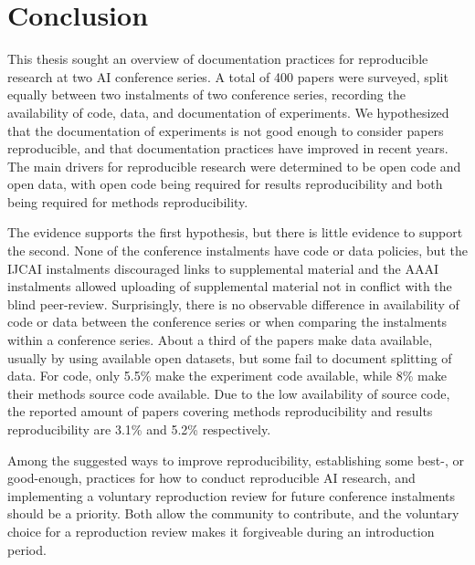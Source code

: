 \section{Conclusion}
This thesis sought an overview of documentation practices for reproducible research at two AI conference series. A total of 400 papers were surveyed, split equally between two instalments of two conference series, recording the availability of code, data, and documentation of experiments. We hypothesized that the documentation of experiments is not good enough to consider papers reproducible, and that documentation practices have improved in recent years. The main drivers for reproducible research were determined to be open code and open data, with open code being required for results reproducibility and both being required for methods reproducibility.

The evidence supports the first hypothesis, but there is little evidence to support the second. None of the conference instalments have code or data policies, but the IJCAI instalments discouraged links to supplemental material and the AAAI instalments allowed uploading of supplemental material not in conflict with the blind peer-review. Surprisingly, there is no observable difference in availability of code or data between the conference series or when comparing the instalments within a conference series. About a third of the papers make data available, usually by using available open datasets, but some fail to document splitting of data. For code, only 5.5\% make the experiment code available, while 8\% make their methods source code available. Due to the low availability of source code, the reported amount of papers covering methods reproducibility and results reproducibility are 3.1\% and 5.2\% respectively.

Among the suggested ways to improve reproducibility, establishing some best-, or good-enough, practices for how to conduct reproducible AI research, and implementing a voluntary reproduction review for future conference instalments should be a priority. Both allow the community to contribute, and the voluntary choice for a reproduction review makes it forgiveable during an introduction period.

